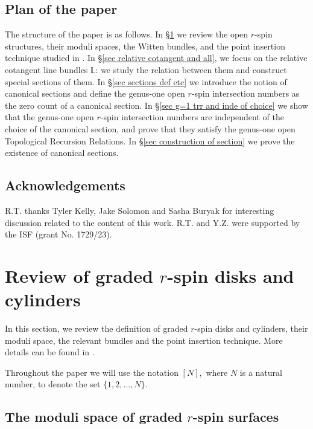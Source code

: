 \documentclass[11pt]{amsart}
\theoremstyle{definition}
\theoremstyle{remark}
\newcommand{\<}{\left<}
\renewcommand{\>}{\right>}
\numberwithin{equation}{section}
\begin{document}
\subsection{Plan of the paper}

The structure of the paper is as follows. In \S\ref{sec review} we review the open $r$-spin structures, their moduli spaces, the Witten bundles, and the point insertion technique studied in \cite{BCT1,TZ1}. In \S \ref{sec relative  cotangent and all}, we focus on the relative cotangent line bundles $\mathbb L$: we study the relation between them and construct special sections of them. In \S \ref{sec sections def etc} we introduce the notion of canonical sections and define the genus-one open $r$-spin intersection numbers as the zero count of a canonical section. In \S \ref{sec g=1 trr  and inde of choice} we show that the genus-one open $r$-spin intersection numbers are independent of the choice of the canonical section, and prove that they satisfy the genus-one open Topological Recursion Relations. In \S\ref{sec construction of section} we prove the existence of canonical sections.


\subsection{Acknowledgements}
R.T. thanks Tyler Kelly, Jake Solomon and Sasha Buryak for interesting discussion related to the content of this work. R.T. and Y.Z. were supported by the ISF (grant No. 1729/23).



\section{Review of graded $r$-spin disks and cylinders}\label{sec review}
\label{sec mod and bundle}
In this section, we review the definition of graded $r$-spin disks and cylinders, their moduli space, the relevant bundles and the point insertion technique.  More details can be found in \cite{BCT1,TZ1}.

Throughout the paper we will use the notation $[N],$ where $N$ is a natural number, to denote the set $\{1,2,\dots,N\}.$


\subsection{The moduli space of graded $r$-spin surfaces}
\end{document}
